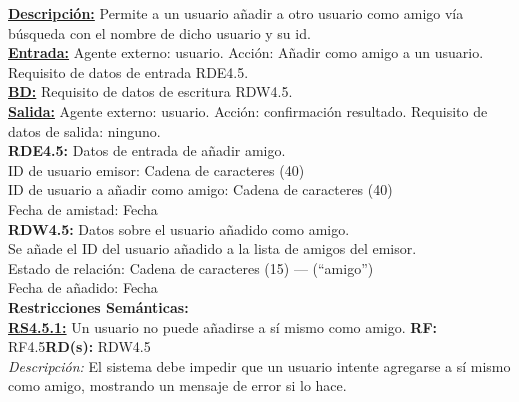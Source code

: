 \textbf{\textcolor{rojo}{\underline{Descripción:}}} Permite a un usuario añadir a otro usuario como amigo vía búsqueda con el nombre de dicho usuario y su id. \\[6pt]

\textbf{\textcolor{rojo}{\underline{Entrada:}}} Agente externo: usuario. Acción: Añadir como amigo a un usuario.
Requisito de datos de entrada \textcolor{azul}{RDE4.5}. \\[6pt]

\textbf{\textcolor{rojo}{\underline{BD:}}} Requisito de datos de escritura \textcolor{azul}{RDW4.5}.\\[6pt]

\textbf{\textcolor{rojo}{\underline{Salida:}}} Agente externo: usuario. Acción: confirmación resultado.
Requisito de datos de salida: ninguno.\\[12pt]


\textcolor{azul}{\textbf{RDE4.5:}} Datos de entrada de añadir amigo. \\[4pt]
\hspace*{1cm} ID de usuario emisor: Cadena de caracteres (40)\\
\hspace*{1cm} ID de usuario a añadir como amigo: Cadena de caracteres (40)\\
\hspace*{1cm} Fecha de amistad: Fecha\\[8pt]

\textcolor{azul}{\textbf{RDW4.5:}} Datos sobre el usuario añadido como amigo. \\[4pt]
\hspace*{1cm} Se añade el ID del usuario añadido a la lista de amigos del emisor.\\
\hspace*{1cm} Estado de relación: Cadena de caracteres (15) — (“amigo”)\\
\hspace*{1cm} Fecha de añadido: Fecha\\[8pt]

\textbf{\textcolor{verde}{Restricciones Semánticas:}} \\[6pt]

\textbf{\textcolor{verde}{\underline{RS4.5.1:}}} Un usuario no puede añadirse a sí mismo como amigo. \textbf{RF:} RF4.5\textbf{RD(s):} RDW4.5 \\ 
\hspace*{1cm} \textit{Descripción:} El sistema debe impedir que un usuario intente agregarse a sí mismo como amigo, mostrando un mensaje de error si lo hace. \\[4pt]

